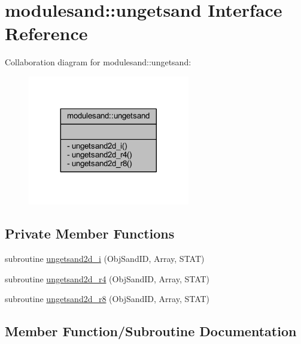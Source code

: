 \hypertarget{interfacemodulesand_1_1ungetsand}{}\section{modulesand\+:\+:ungetsand Interface Reference}
\label{interfacemodulesand_1_1ungetsand}


Collaboration diagram for modulesand\+:\+:ungetsand\+:\nopagebreak
\begin{figure}[H]
\begin{center}
\leavevmode
\includegraphics[width=200pt]{interfacemodulesand_1_1ungetsand__coll__graph}
\end{center}
\end{figure}
\subsection*{Private Member Functions}
\begin{DoxyCompactItemize}
\item 
subroutine \mbox{\hyperlink{interfacemodulesand_1_1ungetsand_a96673d6e94a8cabd00fc739be9169c12}{ungetsand2d\+\_\+i}} (Obj\+Sand\+ID, Array, S\+T\+AT)
\item 
subroutine \mbox{\hyperlink{interfacemodulesand_1_1ungetsand_ac1ec79f4bff94a6fe87b1f082e26f3b0}{ungetsand2d\+\_\+r4}} (Obj\+Sand\+ID, Array, S\+T\+AT)
\item 
subroutine \mbox{\hyperlink{interfacemodulesand_1_1ungetsand_abe6364bb7fa0ae731ff08a72b2ad6b81}{ungetsand2d\+\_\+r8}} (Obj\+Sand\+ID, Array, S\+T\+AT)
\end{DoxyCompactItemize}


\subsection{Member Function/\+Subroutine Documentation}
\mbox{\label{interfacemodulesand_1_1ungetsand_a96673d6e94a8cabd00fc739be9169c12}} 
